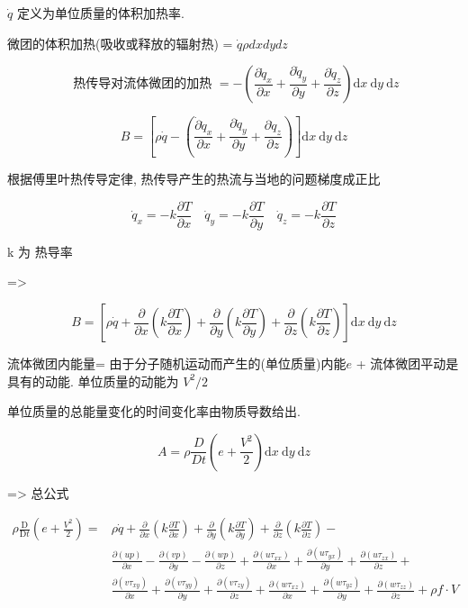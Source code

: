 $\dot{q}$ 定义为单位质量的体积加热率.

微团的体积加热(吸收或释放的辐射热) = $\dot{q} \rho dxdydz$

$$
	\text { 热传导对流体微团的加热 }=-\left(\frac{\partial \dot{q}_{x}}{\partial x}+\frac{\partial \dot{q}_{y}}{\partial y}+\frac{\partial \dot{q}_{z}}{\partial z}\right) \mathrm{d} x \mathrm{~d} y \mathrm{~d} z
$$

$$
	B=\left[\rho \dot{q}-\left(\frac{\dot{\partial} \dot{q}_{x}}{\partial x}+\frac{\partial \dot{q}_{y}}{\partial y}+\frac{\partial \dot{q}_{z}}{\partial z}\right)\right] \mathrm{d} x \mathrm{~d} y \mathrm{~d} z
$$

根据傅里叶热传导定律, 热传导产生的热流与当地的问题梯度成正比

$$
	\dot{q}_{x}=-k \frac{\partial T}{\partial x} \quad \dot{q}_{y}=-k \frac{\partial T}{\partial y} \quad \dot{q}_{z}=-k \frac{\partial T}{\partial z}
$$

k 为 热导率

=>

$$
	B=\left[\rho \dot{q}+\frac{\partial}{\partial x}\left(k \frac{\partial T}{\partial x}\right)+\frac{\partial}{\partial y}\left(k \frac{\partial T}{\partial y}\right)+\frac{\partial}{\partial z}\left(k \frac{\partial T}{\partial z}\right)\right] \mathrm{d} x \mathrm{~d} y \mathrm{~d} z
$$

流体微团内能量= 由于分子随机运动而产生的(单位质量)内能$e$ + 流体微团平动是具有的动能. 单位质量的动能为 $V^2 / 2$

单位质量的总能量变化的时间变化率由物质导数给出.

$$
	A=\rho \frac{D}{D t}\left(e+\frac{V^{2}}{2}\right) \mathrm{d} x \mathrm{~d} y \mathrm{~d} z
$$

=> 总公式

$$
	\begin{aligned}
		\rho \frac{\mathrm{D}}{\mathrm{D} t}\left(e+\frac{V^{2}}{2}\right)= & \rho \dot{q}+\frac{\partial}{\partial x}\left(k \frac{\partial T}{\partial x}\right)+\frac{\partial}{\partial y}\left(k \frac{\partial T}{\partial y}\right)+\frac{\partial}{\partial z}\left(k \frac{\partial T}{\partial z}\right)-                                                                                                        \\
		                                                                    & \frac{\partial(u p)}{\partial x}-\frac{\partial(v p)}{\partial y}-\frac{\partial(w p)}{\partial z}+\frac{\partial\left(u \tau_{x x}\right)}{\partial x}+\frac{\partial\left(u \tau_{y x}\right)}{\partial y}+\frac{\partial\left(u \tau_{z x}\right)}{\partial z}+                                                                           \\
		                                                                    & \frac{\partial\left(v \tau_{x y}\right)}{\partial x}+\frac{\partial\left(v \tau_{y y}\right)}{\partial y}+\frac{\partial\left(v \tau_{z y}\right)}{\partial z}+\frac{\partial\left(w \tau_{x z}\right)}{\partial x}+\frac{\partial\left(w \tau_{y z}\right)}{\partial y}+\frac{\partial\left(w \tau_{z z}\right)}{\partial z}+\rho f \cdot V
	\end{aligned}
$$

